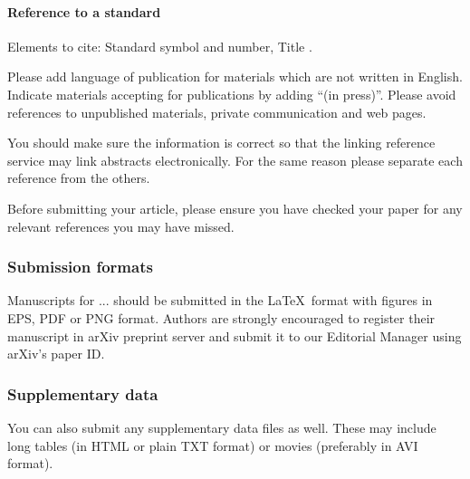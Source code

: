 \paragraph{Reference to a standard}
Elements to cite:
Standard symbol and number,
Title \cite{standard-1,standard-2}.

Please add language of publication for materials which are not written in English. Indicate materials accepting for publications by adding ``(in press)''. Please avoid references to unpublished materials, private communication and web pages.

You should make sure the information is correct so that the linking reference service may link abstracts electronically. For the same reason please separate each reference from the others.

Before submitting your article, please ensure you have checked your paper for any relevant references you may have missed.

\subsubsection{Submission formats}

Manuscripts for ... should be submitted in the \LaTeX ~format with figures in EPS, PDF or PNG format. Authors are strongly encouraged to register their manuscript in arXiv preprint server and submit it to our Editorial Manager using arXiv's paper ID.

\subsubsection{Supplementary data}

You can also submit any supplementary data files as well. These may include long tables (in HTML or plain TXT format) or movies (preferably in AVI format).

